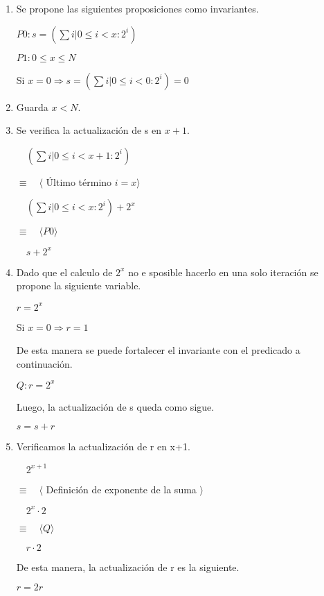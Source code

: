 \documentclass[hidelinks]{article}
\begin{document}
\begin{enumerate}
	\item Se propone las siguientes proposiciones como invariantes.\par
	      \begin{center}
		      $P0: s = (\sum i| 0\leq i < x :2^i)$ \par
		      $P1: 0 \leq x \leq N$ \par
	      \end{center}
	      Si $x = 0 \Rightarrow s = (\sum i| 0\leq i < 0 :2^i) = 0$ \par
	\item Guarda $x < N$.
	\item Se verifica la actualización de s en $x+1$. \par
	      $\quad (\sum i| 0\leq i < x+1 :2^i)$ \par
	      $\equiv \quad \langle$ Último término $ i = x \rangle$ \par
	      $\quad (\sum i| 0\leq i < x :2^i) + 2^x$ \par
	      $\equiv \quad \langle P0 \rangle$ \par
	      $\quad s + 2^x$ \par
	\item Dado que el calculo de $2^x$ no e sposible hacerlo en una solo iteración se
	      propone la siguiente variable. \par
	      $ r = 2^x$ \par
	      Si $x = 0 \Rightarrow r = 1$ \par
	      De esta manera se puede fortalecer el invariante con el predicado a
	      continuación.\par
	      \begin{center}
		      $ Q: r = 2^x$ \par
	      \end{center}
	      Luego, la actualización de s queda como sigue.\par
	      \begin{center}
		      $s = s + r$ \par
	      \end{center}
	\item Verificamos la actualización de r en x+1. \par
	      $\quad 2^{x+1}$ \par
	      $\equiv \quad \langle$ Definición de exponente de la suma $ \rangle$ \par
	      $\quad 2^{x} \cdot 2$ \par
	      $\equiv \quad \langle Q \rangle$ \par
	      $\quad r \cdot 2$ \par

	      De esta manera, la actualización de r es la siguiente. \par

	      \begin{center}
		      $r = 2r$ \par
	      \end{center}

\end{enumerate}
\end{document}
